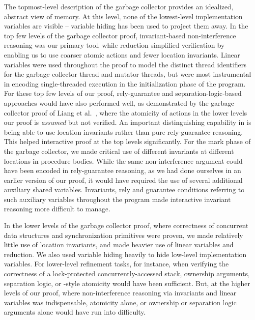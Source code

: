 The topmost-level description of the garbage collector provides an
idealized, abstract view of memory. 
At this level, none of the lowest-level implementation variables are
visible -- variable hiding has been used to project them away. 
In the top few levels of the garbage collector proof, invariant-based
non-interference reasoning was our primary tool, while reduction
simplified verification by enabling us to use coarser atomic actions and fewer
location invariants.  
Linear variables were used throughout the proof to model the distinct
thread identifiers for the garbage collector thread and mutator
threads, but were most instrumental in encoding single-threaded
execution in the initialization phase of the program. 
For these top few levels of our proof, rely-guarantee and separation-logic-based
approaches would have also performed well, as demonstrated by the
garbage collector proof of Liang et al.~\cite{LiangRGSim}, where
the atomicity of actions in the lower levels our proof is {\em assumed} but not verified.
An important distinguishing capability in \civl is being able to use location invariants rather than pure rely-guarantee reasoning.
This helped interactive proof at the top levels significantly.
For the mark phase of the garbage collector, we made critical use of
different invariants at different locations in procedure bodies. 
While the same non-interference argument could have been encoded in
rely-guarantee reasoning, as we had done ourselves in an earlier
version of our proof, 
it would have required the use of several additional auxiliary shared variables. 
Invariants, rely and guarantee conditions referring to such auxiliary
variables throughout the program made interactive invariant reasoning more difficult to manage. 

In the lower levels of the garbage collector proof, where
correctness of concurrent data structures and synchronization primitives were proven, we made
relatively little use of location invariants, and made heavier use of
linear variables and reduction. 
We also used variable hiding heavily to hide low-level implementation
variables. 
For lower-level refinement tasks, for instance, when verifying the correctness of a
lock-protected concurrently-accessed stack, ownership
arguments, separation logic, or \QED-style atomicity would have been
sufficient. 
But, at the higher levels of our proof, where non-interference
reasoning via invariants and linear variables was indispensable, 
atomicity alone, or ownership or separation logic arguments alone
would have run into difficulty. 

